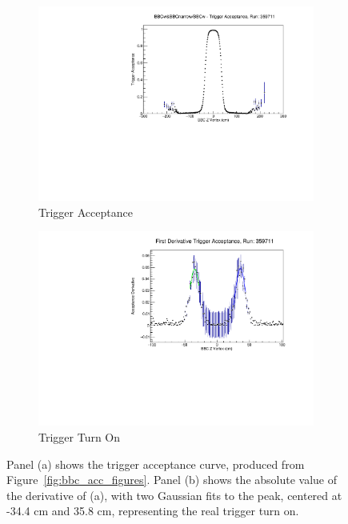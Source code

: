 \begin{figure}
  \centering
  \begin{subfigure}[b]{0.7\linewidth}
    \includegraphics[width=\textwidth]{./figures/trigger_acceptance_359711.pdf}
    \caption{Trigger Acceptance}
    \label{fig:trigger_acceptance}
  \end{subfigure}
  \begin{subfigure}[b]{0.7\linewidth}
    \includegraphics[width=\textwidth]{./figures/trigger_acceptance_derivative.pdf}
    \caption{Trigger Turn On}
    \label{fig:acceptance_turn_on}
  \end{subfigure}
  \caption{
    Panel (a) shows the trigger acceptance curve, produced from
    Figure~\ref{fig:bbc_acc_figures}. Panel (b) shows the absolute
    value of the derivative of (a), with two Gaussian fits to the peak, centered
    at -34.4 cm and 35.8 cm, representing the real trigger turn on.
  }
  \label{fig:acceptance_bbc}
\end{figure}


